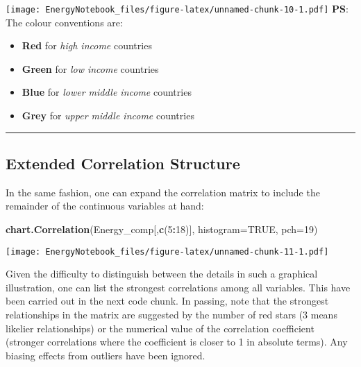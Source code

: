 \documentclass[]{article}
\newenvironment{Shaded}{\begin{snugshade}}{\end{snugshade}}
\newcommand{\KeywordTok}[1]{\textcolor[rgb]{0.13,0.29,0.53}{\textbf{#1}}}
\newcommand{\DataTypeTok}[1]{\textcolor[rgb]{0.13,0.29,0.53}{#1}}
\newcommand{\DecValTok}[1]{\textcolor[rgb]{0.00,0.00,0.81}{#1}}
\newcommand{\OtherTok}[1]{\textcolor[rgb]{0.56,0.35,0.01}{#1}}
\newcommand{\OperatorTok}[1]{\textcolor[rgb]{0.81,0.36,0.00}{\textbf{#1}}}
\newcommand{\NormalTok}[1]{#1}
\providecommand{\tightlist}{%
  \setlength{\itemsep}{0pt}\setlength{\parskip}{0pt}}
\begin{document}
\texttt{[image: EnergyNotebook\_files/figure-latex/unnamed-chunk-10-1.pdf]}
\textbf{PS}: The colour conventions are:

\begin{itemize}
\tightlist
\item
  \textbf{Red} for \emph{high income} countries
\item
  \textbf{Green} for \emph{low income} countries
\item
  \textbf{Blue} for \emph{lower middle income} countries
\item
  \textbf{Grey} for \emph{upper middle income} countries
\end{itemize}

\begin{center}\rule{0.5\linewidth}{\linethickness}\end{center}

\subsection{Extended Correlation
Structure}\label{extended-correlation-structure}

In the same fashion, one can expand the correlation matrix to include
the remainder of the continuous variables at hand:

\begin{Shaded}
\begin{Highlighting}[]
\KeywordTok{chart.Correlation}\NormalTok{(Energy_comp[,}\KeywordTok{c}\NormalTok{(}\DecValTok{5}\OperatorTok{:}\DecValTok{18}\NormalTok{)], }\DataTypeTok{histogram=}\OtherTok{TRUE}\NormalTok{, }\DataTypeTok{pch=}\DecValTok{19}\NormalTok{)}
\end{Highlighting}
\end{Shaded}

\texttt{[image: EnergyNotebook\_files/figure-latex/unnamed-chunk-11-1.pdf]}

Given the difficulty to distinguish between the details in such a
graphical illustration, one can list the strongest correlations among
all variables. This have been carried out in the next code chunk. In
passing, note that the strongest relationships in the matrix are
suggested by the number of red stars (3 means likelier relationships) or
the numerical value of the correlation coefficient (stronger
correlations where the coefficient is closer to 1 in absolute terms).
Any biasing effects from outliers have been ignored.
\end{document}
